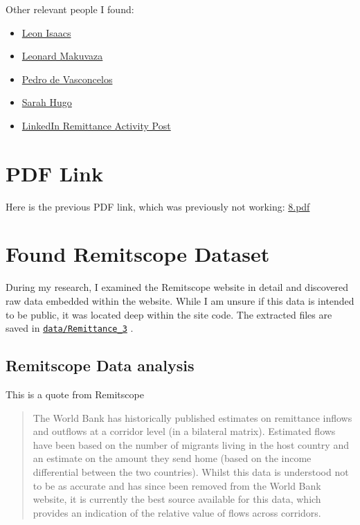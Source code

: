 \documentclass[
  11pt,
]{article}
\providecommand{\tightlist}{%
  \setlength{\itemsep}{0pt}\setlength{\parskip}{0pt}}\usepackage{longtable,booktabs,array}
\begin{document}
Other relevant people I found:

\begin{itemize}
\tightlist
\item
  \href{https://www.linkedin.com/in/leonisaacs/}{Leon Isaacs}
\item
  \href{https://www.linkedin.com/in/leonardmakuvaza/}{Leonard Makuvaza}
\item
  \href{https://www.linkedin.com/in/pedro-de-vasconcelos-899474a/}{Pedro
  de Vasconcelos}
\item
  \href{https://www.linkedin.com/in/sarah-hugo-794a853/}{Sarah Hugo}
\item
  \href{https://www.linkedin.com/posts/financing-facility-for-remittances-ffr_remittance-activity-7311372331552014336-y1XR/}{LinkedIn
  Remittance Activity Post}
\end{itemize}

\section{PDF Link}\label{pdf-link}

Here is the previous PDF link, which was previously not working:
\href{https://github.com/WilliamClintC/RER/blob/main/_output/8.pdf}{8.pdf}

\section{Found Remitscope Dataset}\label{found-remitscope-dataset}

During my research, I examined the Remitscope website in detail and
discovered raw data embedded within the website. While I am unsure if
this data is intended to be public, it was located deep within the site
code. The extracted files are saved in
\href{https://github.com/WilliamClintC/RER/tree/main/data/Remittance_3}{\texttt{data/Remittance\_3}}
.

\subsection{Remitscope Data analysis}\label{remitscope-data-analysis}

This is a quote from Remitscope

\begin{quote}
The World Bank has historically published estimates on remittance
inflows and outflows at a corridor level (in a bilateral matrix).
Estimated flows have been based on the number of migrants living in the
host country and an estimate on the amount they send home (based on the
income differential between the two countries). Whilst this data is
understood not to be as accurate and has since been removed from the
World Bank website, it is currently the best source available for this
data, which provides an indication of the relative value of flows across
corridors.
\end{quote}
\end{document}
